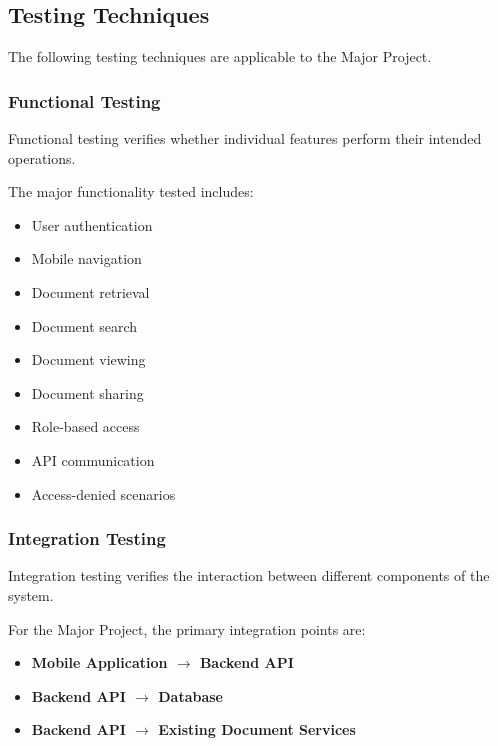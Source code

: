 \documentclass[12pt]{article}
\begin{document}
\subsection{Testing Techniques}

The following testing techniques are applicable to the Major Project.


\subsubsection{Functional Testing}

Functional testing verifies whether individual features perform their intended operations.

The major functionality tested includes:

\begin{itemize}
    \item User authentication
    \item Mobile navigation
    \item Document retrieval
    \item Document search
    \item Document viewing
    \item Document sharing
    \item Role-based access
    \item API communication
    \item Access-denied scenarios
\end{itemize}


\subsubsection{Integration Testing}

Integration testing verifies the interaction between different components of the system.

For the Major Project, the primary integration points are:

\begin{itemize}
    \item \textbf{Mobile Application $\rightarrow$ Backend API}
    \item \textbf{Backend API $\rightarrow$ Database}
    \item \textbf{Backend API $\rightarrow$ Existing Document Services}
\end{itemize}
\end{document}

